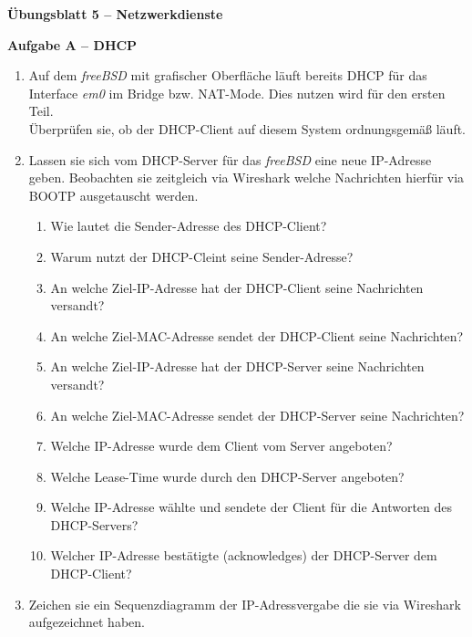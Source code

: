 \documentclass[paper=a4,fontsize=11pt]{scrartcl}%
\numberwithin{equation}{section}
\begin{document}
\begin{center}
\Large{\textbf{Übungsblatt 5 -- Netzwerkdienste}}
\end{center}


\begin{center}\Large{\textbf{Aufgabe A -- DHCP}}\end{center}\vskip0.25in

\begin{enumerate}
	\item Auf dem \emph{freeBSD} mit grafischer Oberfläche läuft bereits DHCP für das Interface \emph{em0} im Bridge bzw. NAT-Mode. Dies nutzen wird für den ersten Teil.\\
	Überprüfen sie, ob der DHCP-Client auf diesem System ordnungsgemäß läuft.
	\item Lassen sie sich vom DHCP-Server für das \emph{freeBSD} eine neue IP-Adresse geben. Beobachten sie zeitgleich via Wireshark welche Nachrichten hierfür via BOOTP ausgetauscht werden.
	\begin{enumerate}[label=(\alph*)]
		\item Wie lautet die Sender-Adresse des DHCP-Client?
		\item Warum nutzt der DHCP-Cleint seine Sender-Adresse?
		\item An welche Ziel-IP-Adresse hat der DHCP-Client seine Nachrichten versandt?
		\item An welche Ziel-MAC-Adresse sendet der DHCP-Client seine Nachrichten?
		\item An welche Ziel-IP-Adresse hat der DHCP-Server seine Nachrichten versandt?
		\item An welche Ziel-MAC-Adresse sendet der DHCP-Server seine Nachrichten?
		\item Welche IP-Adresse wurde dem Client vom Server angeboten?
		\item Welche Lease-Time wurde durch den DHCP-Server angeboten?
		\item Welche IP-Adresse wählte und sendete der Client für die Antworten des DHCP-Servers?
		\item Welcher IP-Adresse bestätigte (acknowledges) der DHCP-Server dem DHCP-Client?
	\end{enumerate}
	\item Zeichen sie ein Sequenzdiagramm der IP-Adressvergabe die sie via Wireshark aufgezeichnet haben.
\end{enumerate}
\end{document}
